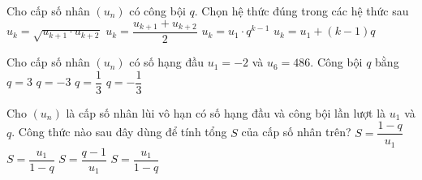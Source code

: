 

\begin{ex}%
	Cho cấp số nhân $(u_n)$ có công bội $q$. Chọn hệ thức đúng trong  các hệ thức sau
	\choice 
		 {$u_k=\sqrt{u_{k+1}\cdot u_{k+2}}$}
		{$u_k=\dfrac{u_{k+1}+u_{k+2}}{2}$} 
		{\True $u_k=u_1\cdot  q^{k-1}$}
		{$u_k=u_1+(k-1)q$} 
\end{ex}

\begin{ex}%
	Cho cấp số nhân $(u_n)$ có số hạng đầu $u_1=-2$ và $u_6=486$. Công bội $q$  bằng
	\choice 
		 {$q=3$}
		{\True $q=-3$} 
		 {$q=\dfrac{1}{3}$}
		{$q=-\dfrac{1}{3}$} 
\end{ex}

\begin{ex}%
	Cho $(u_n)$ là cấp số nhân lùi vô hạn có số hạng đầu và  công bội lần lượt là $u_1$ và $q$. Công thức nào sau đây dùng để tính tổng $S$ của cấp số nhân trên?
	 \choice
		 {$S=\dfrac{1-q}{u_1}$}
		 {$S=\dfrac{u_1}{1-q}$}
		{$S=\dfrac{q-1}{u_1}$} 
		 {\True $S=\dfrac{u_1}{1-q}$}
\end{ex}

